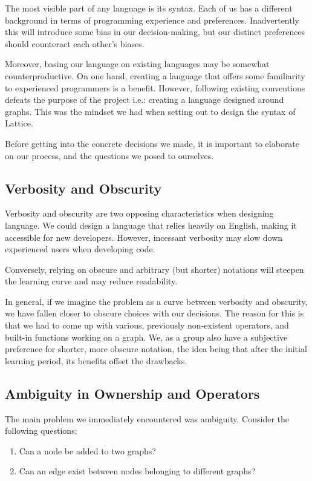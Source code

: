 The most visible part of any language is its syntax.
Each of us has a different background in terms of programming experience and preferences.
Inadvertently this will introduce some bias in our decision-making, but our distinct preferences
should counteract each other's biases.

Moreover, basing our language on existing languages may be somewhat counterproductive.
On one hand, creating a language that offers some familiarity to experienced programmers is a benefit.
However, following existing conventions defeats the purpose of the project i.e.: creating a language designed around graphs.
This was the mindset we had when setting out to design the syntax of Lattice.

Before getting into the concrete decisions we made, it is important to elaborate on our process, and the questions
we posed to ourselves.

\subsection{Verbosity and Obscurity}\label{subsec:syntax_verbostiy_and_obscurity}
Verbosity and obscurity are two opposing characteristics when designing language.
We could design a language that
relies heavily on English, making it accessible for new developers.
However, incessant verbosity may slow down experienced users when developing code.

Conversely, relying on obscure and arbitrary (but shorter) notations will
steepen the learning curve and may reduce readability.

In general, if we imagine the problem as a curve between verbosity and obscurity, we have fallen closer to
obscure choices with our decisions.
The reason for this is that we had to come up with various, previously
non-existent operators, and built-in functions working on a graph.
We, as a group also have a subjective preference for shorter, more obscure notation, the idea being that
after the initial learning period, its benefits offset the drawbacks.


\subsection{Ambiguity in Ownership and Operators}\label{subsec:syntax_ambigoutiy_in_ownership_and_operators}
The main problem we immediately encountered was ambiguity.
Consider the following questions:

\begin{enumerate}
    \item Can a node be added to two graphs?
    \item Can an edge exist between nodes belonging to different graphs?
\end{enumerate}

